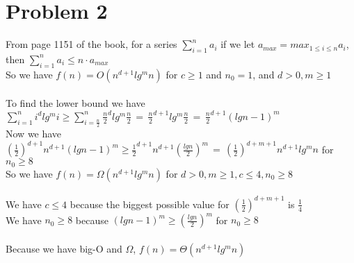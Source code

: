 \documentclass{article}
\begin{document}
\section*{Problem 2}
From page 1151 of the book, for a series $\sum_{i=1}^na_i$ if we let $a_{max}=max_{1\leq i \leq n}a_i$, then $\sum_{i=1}^na_i \leq n \cdot a_{max}$\\
So we have $f(n)=O(n^{d+1}lg^mn)$ for $c\geq 1$ and $n_0=1$, and $d > 0, m\geq 1$\\\\
To find the lower bound we have $\sum_{i=1}^ni^dlg^mi \geq \sum_{i=\frac{n}{2}}^n\frac{n}{2}^dlg^m\frac{n}{2}\,=\,\frac{n}{2}^{d+1}lg^m\frac{n}{2}\,=\,\frac{n}{2}^{d+1}(lgn-1)^m$\\
Now we have $(\frac{1}{2})^{d+1}n^{d+1}(lgn-1)^m \geq \frac{1}{2}^{d+1}n^{d+1}(\frac{lgn}{2})^m\,=\,(\frac{1}{2})^{d+m+1}n^{d+1}lg^mn$ for $n_0\geq 8$\\
So we have $f(n)=\Omega(n^{d+1}lg^mn)$ for $d > 0, m\geq 1, c\leq 4, n_0 \geq 8$\\\\
We have $c\leq 4$ because the biggest possible value for $(\frac{1}{2})^{d+m+1}$ is $\frac{1}{4}$\\
We have $n_0 \geq 8$ because $(lgn-1)^m\geq (\frac{lgn}{2})^m$ for $n_0 \geq 8$\\\\
Because we have big-O and $\Omega$, $f(n)=\Theta(n^{d+1}lg^mn)$
\end{document}
